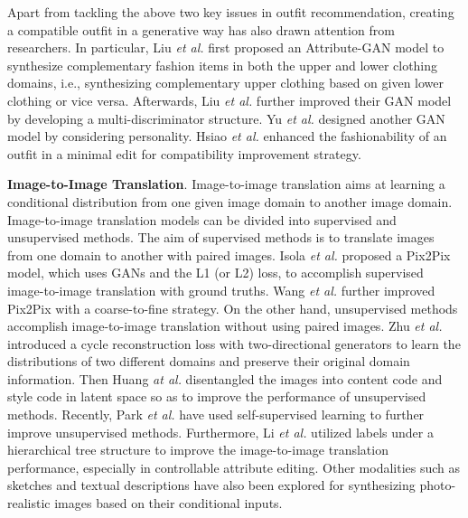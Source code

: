 Apart from tackling the above two key issues in outfit recommendation, creating a compatible outfit in a generative way has also drawn attention from researchers.
In particular, Liu \textit{et al.}\cite{liu2019toward} first proposed an Attribute-GAN model to synthesize complementary fashion items in both the upper and lower clothing domains, i.e., synthesizing complementary upper clothing based on given lower clothing or vice versa.
Afterwards, Liu \textit{et al.}\cite{liu2019collocating} further improved their GAN model by developing a multi-discriminator structure.
Yu \textit{et al.} \cite{yu2019personalized} designed another GAN model by considering personality.
Hsiao \textit{et al.} \cite{hsiao2019fashion++} enhanced the fashionability of an outfit in a minimal edit for compatibility improvement strategy.

\textbf{Image-to-Image Translation}.
Image-to-image translation aims at learning a conditional distribution from one given image domain to another image domain.
Image-to-image translation models can be divided into supervised \cite{pix2pix2017, wang2018pix2pixHD} and unsupervised methods\cite{huang2018munit,CycleGAN2017,park2020cut}.
The aim of supervised methods is to translate images from one domain to another with paired images.
Isola \textit{et al.} \cite{pix2pix2017} proposed a Pix2Pix model, which uses GANs and the L1 (or L2) loss, to accomplish supervised image-to-image translation with ground truths.
Wang \textit{et al.} \cite{wang2018pix2pixHD} further improved Pix2Pix with a coarse-to-fine strategy.
On the other hand, unsupervised methods accomplish image-to-image translation without using paired images.
Zhu \textit{et al.} \cite{CycleGAN2017} introduced a cycle reconstruction loss with two-directional generators to learn the distributions of two different domains and preserve their original domain information.
Then Huang \textit{at al.} \cite{huang2018munit} disentangled the images into content code and style code in latent space so as to improve the performance of unsupervised methods.
Recently, Park \textit{et al.} \cite{park2020cut} have used self-supervised learning to further improve unsupervised methods. Furthermore, Li \textit{et al.}\cite{li2021image} utilized labels under a hierarchical tree structure to improve the image-to-image translation performance, especially in controllable attribute editing. Other modalities such as sketches\cite{li2020staged} and textual descriptions \cite{yang2021multi} have also been explored for synthesizing photo-realistic images based on their conditional inputs.

